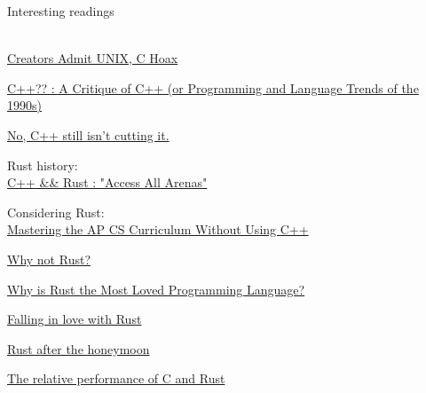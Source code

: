 \documentclass[usenames,dvipsnames,10pt,aspectratio=169]{beamer}
\begin{document}
\begin{frame}{Interesting readings} 

\\

\href{https://web.archive.org/web/19980425023657/http://paul.merton.ox.ac.uk/computing/unix.html}
{Creators Admit UNIX, C Hoax}

\href{https://web.archive.org/web/19990302094922/http://www.elj.com/cppcv3/}
{C++?? : A Critique of C++ (or Programming and Language Trends of the 1990s)}

\href{https://da-data.blogspot.com/2020/10/no-c-still-isnt-cutting-it.html}
{No, C++ still isn't cutting it.}

\vspace{0.5cm}
Rust history:\\ 

\href{https://youtu.be/HiWkMFE8uRE}{C++ \&\& Rust : "Access All Arenas"}

\vspace{0.5cm}
Considering Rust:\\

\href{https://web.archive.org/web/20030625015044/http://www.cs.rice.edu/CS/PLT/Teaching/Talks/TCEA-State-1998/C++/}
{Mastering the AP CS Curriculum Without Using C++}

\href{https://matklad.github.io/2020/09/20/why-not-rust.html}
{Why not Rust?}

\href{https://matklad.github.io/2020/02/14/why-rust-is-loved.html}
{Why is Rust the Most Loved Programming Language?}

\href{http://dtrace.org/blogs/bmc/2018/09/18/falling-in-love-with-rust/}
{Falling in love with Rust}

\href{http://dtrace.org/blogs/bmc/2020/10/11/rust-after-the-honeymoon/}
{Rust after the honeymoon}

\href{http://dtrace.org/blogs/bmc/2018/09/28/the-relative-performance-of-c-and-rust/}
{The relative performance of C and Rust}

\end{frame}
\end{document}
